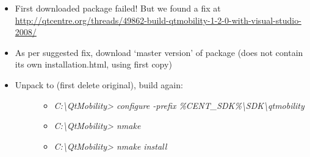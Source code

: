\documentclass[letterpaper,10pt,english]{sphinxmanual}
\def\PYGZbs{\char`\\}
\begin{document}
\begin{enumerate}
\begin{description}
\begin{itemize}
\begin{description}
\begin{itemize}
\end{itemize}

\begin{Verbatim}[commandchars=\\\{\}]
dsvideowidgetcontrol.cpp

c:\PYGZbs{}users\PYGZbs{}admin\_cent\PYGZbs{}downloads\PYGZbs{}qt-mobility-opensource-src-1.2.0\PYGZbs{}plugins\PYGZbs{}multimedi

a\PYGZbs{}directshow\PYGZbs{}camera\PYGZbs{}dscamerasession.h(68) : fatal error C1083: Cannot open inclu

de file: 'qedit.h': No such file or directory

Generating Code...

NMAKE : fatal error U1077: '"C:\PYGZbs{}Program Files (x86)\PYGZbs{}Microsoft Visual Studio 10.0

\PYGZbs{}VC\PYGZbs{}BIN\PYGZbs{}cl.EXE"' : return code '0x2'

Stop.
\end{Verbatim}

\end{description}

\item {} 
First downloaded package failed! But we found a fix at \href{http://qtcentre.org/threads/49862-build-qtmobility-1-2-0-with-visual-studio-2008/}{http://qtcentre.org/threads/49862-build-qtmobility-1-2-0-with-visual-studio-2008/}

\item {} 
As per suggested fix, download `master version' of package (does not contain its own installation.html, using first copy)

\item {} \begin{description}
\item[{Unpack to  (first delete original), build again:}] \leavevmode\begin{itemize}
\item {} 
\emph{C:\textbackslash{}QtMobility\textgreater{} configure -prefix \%CENT\_SDK\%\textbackslash{}SDK\textbackslash{}qtmobility}

\item {} 
\emph{C:\textbackslash{}QtMobility\textgreater{} nmake}

\item {} 
\emph{C:\textbackslash{}QtMobility\textgreater{} nmake install}

\end{itemize}


\end{description}
\end{itemize}
\end{description}
\end{enumerate}
\end{document}
